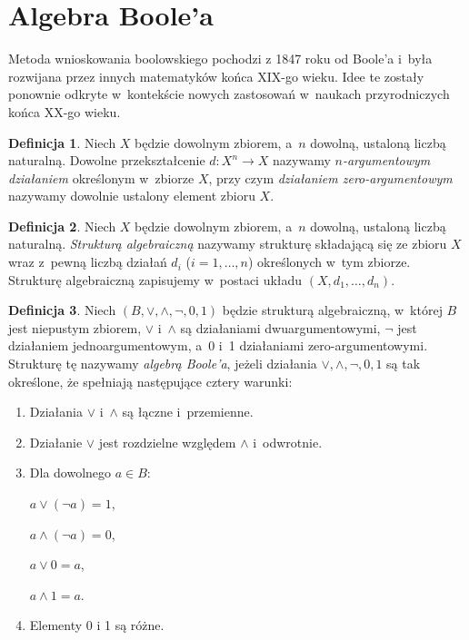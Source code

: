 \documentclass[a4paper,11pt,twoside]{article}
\theoremstyle{definition}
\newtheorem{df}{Definicja}
\begin{document}
\section*{Algebra Boole'a}

Metoda wnioskowania boolowskiego pochodzi z 1847 roku od Boole'a i~była rozwijana przez innych matematyków końca XIX-go wieku. Idee te zostały ponownie odkryte w~kontekście nowych zastosowań w~naukach przyrodniczych końca XX-go wieku.

\begin{df}
Niech $X$ będzie dowolnym zbiorem, a~$n$ dowolną, ustaloną liczbą naturalną. Dowolne przekształcenie $d\colon X^n \to X$ nazywamy {\em $n$-argumentowym działaniem} określonym w~zbiorze $X$, przy czym {\em działaniem zero-argumentowym} nazywamy dowolnie ustalony element zbioru $X$.
\end{df}

\begin{df}
Niech $X$ będzie dowolnym zbiorem, a~$n$ dowolną, ustaloną liczbą naturalną. {\em Strukturą algebraiczną} nazywamy strukturę składającą się ze zbioru $X$ wraz z~pewną liczbą działań $d_i$ ($i = 1,\dots,n$) określonych w~tym zbiorze. Strukturę algebraiczną zapisujemy w~postaci układu $(X,d_1,\dots,d_n)$.
\end{df}

\begin{df}
Niech $(B,\vee,\wedge,\neg,0,1)$ będzie strukturą algebraiczną, w~której $B$ jest niepustym zbiorem, $\vee$ i~$\wedge$ są działaniami dwuargumentowymi, $\neg$ jest działaniem jednoargumentowym, a~0 i~1 działaniami zero-argumentowymi. Strukturę tę nazywamy {\em algebrą Boole'a}, jeżeli działania $\vee,\wedge,\neg,0,1$ są tak określone, że spełniają następujące cztery warunki:
\end{df}

\begin{enumerate}
    \item Działania $\vee$ i~$\wedge$ są łączne i~przemienne.
    \item Działanie $\vee$ jest rozdzielne względem $\wedge$ i~odwrotnie.
    \item Dla dowolnego $a \in B$:

    ${a \vee (\neg a) = 1}$,

    ${a \wedge (\neg a) = 0}$,

    ${a \vee 0 = a}$,

    ${a \wedge 1 = a}$.

    \item Elementy 0 i 1 są różne.
\end{enumerate}
\end{document}
